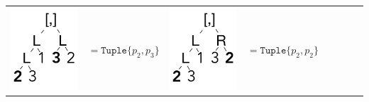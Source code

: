 \documentclass[a4paper,english]{lipics-v2019}
\newcommand{\xt}[1]{\texttt{#1}}
\newcommand{\tuple}[1]{\xt{Tuple\{}#1\xt{\}}}
\begin{document}
\smallskip
{\small
\begin{tabular}{@{}l@{~}ll@{~}ll@{~}ll@{~}l}
\begin{minipage}{1.2cm}\includegraphics[scale=.25]{figures/tree2.pdf} 
\end{minipage} &  $ =   \tuple{p_2,p_3} $ &
\begin{minipage}{1.2cm}\includegraphics[scale=.25]{figures/tree3.pdf} 
\end{minipage} &  $ =   \tuple{p_2,p_2} $ 

\end{tabular}}
\end{document}
